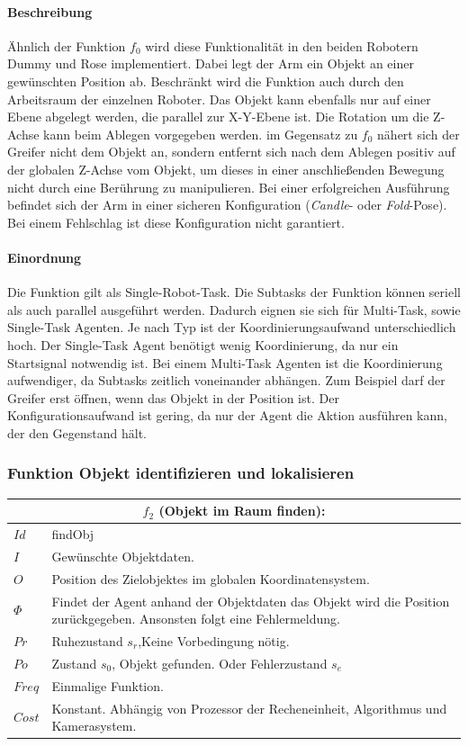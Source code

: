 \paragraph{Beschreibung}
Ähnlich der Funktion $f_0$ wird diese Funktionalität in den beiden Robotern Dummy und Rose implementiert. Dabei legt der Arm ein Objekt an einer gewünschten Position ab. Beschränkt wird die Funktion auch durch den Arbeitsraum der einzelnen Roboter.  Das Objekt kann ebenfalls nur auf einer Ebene abgelegt werden, die parallel zur X-Y-Ebene ist. Die Rotation um die Z-Achse kann beim Ablegen vorgegeben werden. im Gegensatz zu $f_0$ nähert sich der Greifer nicht dem Objekt an, sondern entfernt sich nach dem Ablegen positiv auf der globalen Z-Achse vom Objekt, um dieses in einer anschließenden Bewegung nicht durch eine Berührung zu manipulieren. Bei einer erfolgreichen Ausführung befindet sich der Arm in einer sicheren Konfiguration (\textit{Candle}- oder \textit{Fold}-Pose). Bei einem Fehlschlag ist diese Konfiguration nicht garantiert.

\paragraph{Einordnung}
Die Funktion gilt als Single-Robot-Task. Die Subtasks der Funktion können seriell als auch parallel ausgeführt werden. Dadurch eignen sie sich für Multi-Task, sowie Single-Task Agenten. Je nach Typ ist der Koordinierungsaufwand unterschiedlich hoch. Der Single-Task Agent benötigt wenig Koordinierung, da nur ein Startsignal notwendig ist. Bei einem Multi-Task Agenten ist die Koordinierung aufwendiger, da Subtasks zeitlich voneinander abhängen. Zum Beispiel darf der Greifer erst öffnen, wenn das Objekt in der Position ist. Der Konfigurationsaufwand ist gering, da nur der Agent die Aktion ausführen kann, der den Gegenstand hält. 

\subsubsection{Funktion Objekt identifizieren und lokalisieren}
\label{sec:funraum}

\begin{tabular}{|p{3cm}|p{10cm}|}
	\multicolumn{2}{c}{$f_2$ (Objekt im Raum finden):}\\
	\hline  $Id$ & findObj\\ 
	\hline  $I$ & Gewünschte Objektdaten. \\ 
	\hline  $O$ & Position des Zielobjektes im globalen Koordinatensystem. \\ 
	\hline  $\Phi$ & Findet der Agent anhand der Objektdaten das Objekt wird die Position zurückgegeben. Ansonsten folgt eine Fehlermeldung.\\ 
	\hline $Pr$ & Ruhezustand $s_r$,Keine Vorbedingung nötig. \\ 
	\hline $Po$ & Zustand $s_0$, Objekt gefunden. Oder Fehlerzustand $s_e$\\ 
	\hline $Freq$ & Einmalige Funktion.\\ 
	\hline $Cost$ & Konstant. Abhängig von Prozessor der Recheneinheit, Algorithmus und Kamerasystem. \\
	\hline
\end{tabular} 


